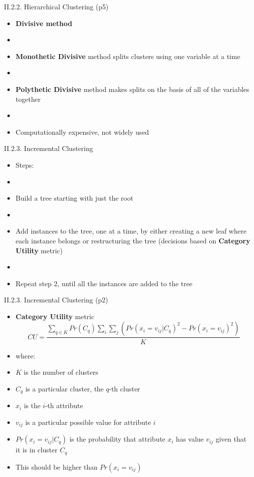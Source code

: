 \documentclass[handout]{beamer}
\newcommand{\stronger}[1]{\textbf{\color{purple} #1}}
\begin{document}
\begin{frame}{II.2.2. Hierarchical Clustering (p5)}
\begin{itemize}
\item[] \stronger{Divisive method}
\item[]
\item \stronger{Monothetic Divisive} method splits clusters using one variable at a time
\item[]
\item \stronger{Polythetic Divisive} method makes splits on the basis of all of the variables together
\item[]
\item Computationally expensive, not widely used
\end{itemize}
\end{frame}
\begin{frame}{II.2.3. Incremental Clustering}
\begin{itemize}
\item Steps:
\item[]
\item[1.] Build a tree starting with just the root
\item[]
\item[2.] Add instances to the tree, one at a time, by either creating a new leaf where each instance belongs or restructuring the tree (decisions based on \stronger{Category Utility} metric)
\item[]
\item[3.] Repeat step 2, until all the instances are added to the tree
\end{itemize}
\end{frame}
\begin{frame}{II.2.3. Incremental Clustering (p2)}
\begin{itemize}
\item[] \stronger{Category Utility} metric
\[
CU = \frac{ \sum_{q \in K}{Pr(C_q)} \sum_i{\sum_j{(Pr(x_i=v_{ij}|C_q)^2 - Pr(x_i=v_{ij})^2)}}}{K}
\]
\item[] where:
\item[] $K$ is the number of clusters
\item[] $C_q$ is a particular cluster, the $q$-th cluster
\item[] $x_i$ is the $i$-th attribute
\item[] $v_{ij}$ is a particular possible value for attribute $i$
\item $Pr(x_i=v_{ij}|C_q)$ is the probability that attribute $x_i$ has value $v_{ij}$ given that it is in cluster $C_q$
\item This should be higher than $Pr(x_i=v_{ij})$
\end{itemize}
\end{frame}
\end{document}
